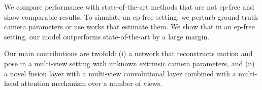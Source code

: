 We compare performance with state-of-the-art methods that are not ep-free and show comparable results. To simulate an ep-free setting, we perturb ground-truth camera parameters or use works that estimate them. We show that in an ep-free setting, our model outperforms state-of-the-art by a large margin. 

Our main contributions are twofold: (i) a network that reconstructs motion and pose in a multi-view setting with unknown extrinsic camera parameters, and (ii) a novel fusion layer with a multi-view convolutional layer combined with a multi-head attention mechanism over a number of views.
